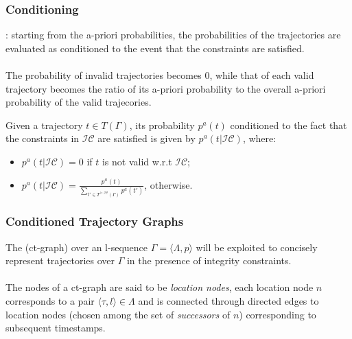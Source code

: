 \begin{frame}
\frametitle{Conditioning}

: starting from the a-priori probabilities, the probabilities of the trajectories are evaluated as conditioned to the event that the constraints are satisfied.\\~\\

\textrm{The probability of invalid trajectories becomes 0, while that of each valid trajectory becomes the ratio of its a-priori probability to the overall a-priori probability of the valid trajecories.}

\begin{block}{}
  Given a trajectory $t \in T(\Gamma)$, its probability $p^a(t)$ conditioned to the fact that the constraints in $\mathcal{IC}$ are satisfied is given by $p^a(t|\mathcal{IC})$, where:

  \begin{itemize}
    \item $p^a(t|\mathcal{IC}) = 0$ if $t$ is not valid w.r.t $\mathcal{IC}$;
    \item $p^a(t|\mathcal{IC}) = \frac{p^a(t)}{\sum_{t' \in T^{\models \mathcal{IC}}(\Gamma)} p^a(t')}$, otherwise.
  \end{itemize}

\end{block}

\end{frame}


\begin{frame}
\frametitle{Conditioned Trajectory Graphs}

The  (ct-graph) over an l-sequence $\Gamma = \langle \Lambda,p \rangle$ will be exploited to concisely represent trajectories over $\Gamma$ in the presence of integrity constraints.\\~\\

The nodes of a ct-graph are said to be \emph{location nodes}, each location node $n$ corresponds to a pair $\langle \tau,l \rangle \in \Lambda$ and is connected through directed edges to location nodes (chosen among the set of \emph{successors} of $n$) corresponding to subsequent timestamps.

\end{frame}


